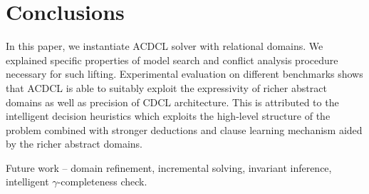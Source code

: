 \section{Conclusions}
In this paper, we instantiate ACDCL solver with relational domains.  We explained specific properties of model search and conflict analysis procedure necessary
for such lifting.  Experimental evaluation on different benchmarks shows that
ACDCL is able to suitably exploit the expressivity of richer
abstract domains as well as precision of CDCL architecture.
This is attributed to the intelligent decision heuristics
which exploits the high-level structure of the problem
combined with stronger deductions and clause learning
mechanism aided by the richer abstract domains.

Future work -- domain refinement, incremental solving, invariant inference, intelligent $\gamma$-completeness check. 
